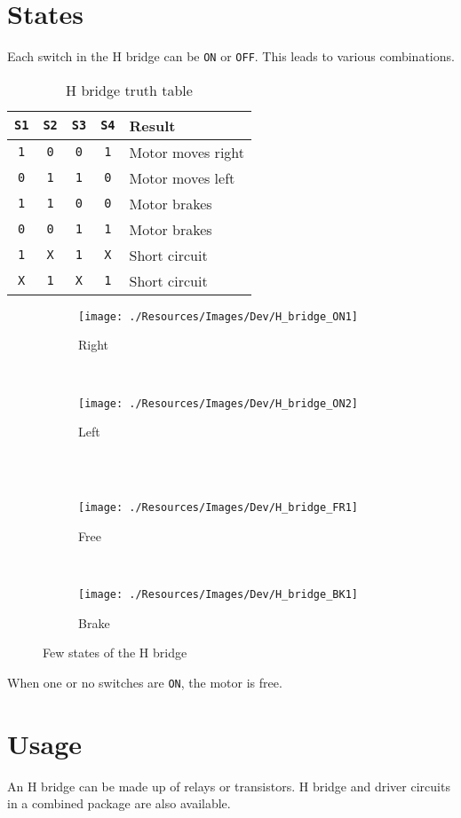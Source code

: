 \documentclass{article}
\begin{document}
\section{States}
	
	Each switch in the H bridge can be \texttt{ON} or \texttt{OFF}. This leads to various combinations.

	\begin{table}[h]
	\caption{H bridge truth table}
		\begin{center}
		\begin{tabular}{|c|c|c|c|l|}
			\hline
			\texttt{S1} & \texttt{S2} & \texttt{S3} & \texttt{S4} & Result \\ \hline
			\texttt{1} & \texttt{0} & \texttt{0} & \texttt{1} & Motor moves right \\ \hline
			\texttt{0} & \texttt{1} & \texttt{1} & \texttt{0} & Motor moves left \\ \hline
			\texttt{1} & \texttt{1} & \texttt{0} & \texttt{0} & Motor brakes \\ \hline
			\texttt{0} & \texttt{0} & \texttt{1} & \texttt{1} & Motor brakes \\ \hline
			\texttt{1} & \texttt{X} & \texttt{1} & \texttt{X} & Short circuit \\ \hline
			\texttt{X} & \texttt{1} & \texttt{X} & \texttt{1} & Short circuit \\ \hline
		\end{tabular}
		\end{center}
	\end{table}

	
	\begin{figure}[h]
		\centering
		\begin{subfigure}[b]{0.45\textwidth}
			\texttt{[image: ./Resources/Images/Dev/H\_bridge\_ON1]}
			\caption{Right}
		\end{subfigure}
		~
		\begin{subfigure}[b]{0.45\textwidth}
			\texttt{[image: ./Resources/Images/Dev/H\_bridge\_ON2]}
			\caption{Left}
		\end{subfigure}
		\\~\\
		\begin{subfigure}[b]{0.45\textwidth}
			\texttt{[image: ./Resources/Images/Dev/H\_bridge\_FR1]}
			\caption{Free}
		\end{subfigure}
		~
		\begin{subfigure}[b]{0.45\textwidth}
			\texttt{[image: ./Resources/Images/Dev/H\_bridge\_BK1]}
			\caption{Brake}
		\end{subfigure}
		\caption{Few states of the H bridge}\label{fig:animals}
	\end{figure}

	When one or no switches are \texttt{ON}, the motor is free.

\section{Usage}
	
	An H bridge can be made up of relays or transistors. H bridge and driver circuits in a combined package are also available.
\end{document}
